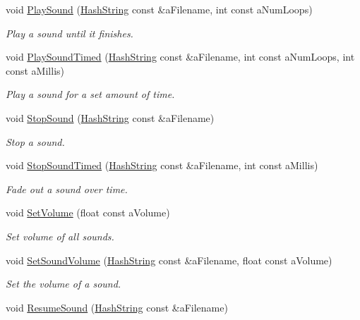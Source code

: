 \begin{DoxyCompactItemize}
void \hyperlink{classSoundManager_a206d6c660e52a947fc625401f7fe09c5}{Play\+Sound} (\hyperlink{classHashString}{Hash\+String} const \&a\+Filename, int const a\+Num\+Loops)
\begin{DoxyCompactList}\small\item\em Play a sound until it finishes. \end{DoxyCompactList}\item 
void \hyperlink{classSoundManager_accdc4f26346b6903bea77a270065f9cb}{Play\+Sound\+Timed} (\hyperlink{classHashString}{Hash\+String} const \&a\+Filename, int const a\+Num\+Loops, int const a\+Millis)
\begin{DoxyCompactList}\small\item\em Play a sound for a set amount of time. \end{DoxyCompactList}\item 
void \hyperlink{classSoundManager_a57062d115ff6fa3e28dbba61d3813927}{Stop\+Sound} (\hyperlink{classHashString}{Hash\+String} const \&a\+Filename)
\begin{DoxyCompactList}\small\item\em Stop a sound. \end{DoxyCompactList}\item 
void \hyperlink{classSoundManager_a644f251bd30be671f63261a58ee40489}{Stop\+Sound\+Timed} (\hyperlink{classHashString}{Hash\+String} const \&a\+Filename, int const a\+Millis)
\begin{DoxyCompactList}\small\item\em Fade out a sound over time. \end{DoxyCompactList}\item 
void \hyperlink{classSoundManager_a714cc8f96b977515ff86bbe80065ca35}{Set\+Volume} (float const a\+Volume)
\begin{DoxyCompactList}\small\item\em Set volume of all sounds. \end{DoxyCompactList}\item 
void \hyperlink{classSoundManager_a3bd5ae98d9be4d5bcdf5f9e39f2e63d6}{Set\+Sound\+Volume} (\hyperlink{classHashString}{Hash\+String} const \&a\+Filename, float const a\+Volume)
\begin{DoxyCompactList}\small\item\em Set the volume of a sound. \end{DoxyCompactList}\item 
void \hyperlink{classSoundManager_af8604e7d36821d28c89cdc9b0703a7d0}{Resume\+Sound} (\hyperlink{classHashString}{Hash\+String} const \&a\+Filename)

\end{DoxyCompactItemize}
